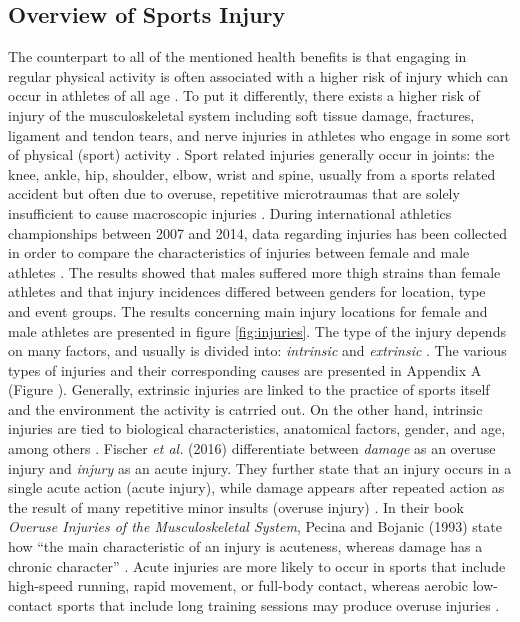 \subsection{Overview of Sports Injury}\label{subsection:injury}
The counterpart to all of the mentioned health benefits is that engaging in regular physical activity is often associated with a higher risk of injury which can occur in athletes of all age \cite{van1997severity}. To put it differently, there exists a higher risk of injury of the musculoskeletal system including soft tissue
damage, fractures, ligament and tendon tears, and nerve injuries in athletes who engage in some sort of physical (sport) activity \cite{mayr2015prevention}. Sport related injuries generally occur in joints: the knee, ankle, hip, shoulder, elbow, wrist and spine, usually from a sports related accident but often due to overuse, repetitive microtraumas that are solely insufficient to cause macroscopic injuries
 \cite{mayr2015prevention}. During international athletics championships between 2007 and 2014, data regarding injuries has been collected in order to compare the characteristics of injuries between female and male athletes \cite{edouard2015sex}. The results showed that males suffered more thigh strains than female athletes and that injury incidences differed between genders for location, type and event groups. The results concerning main injury locations for female and male athletes are presented in figure \ref{fig:injuries}. The type of the injury depends on many factors, and usually is divided into: \textit{intrinsic} and \textit{extrinsic} \cite{mayr2015prevention}. The various types of injuries and their corresponding causes are presented in Appendix A (Figure %
). Generally, extrinsic injuries are linked to the practice of sports itself and the environment the activity is catrried out. On the other hand, intrinsic injuries are tied to biological characteristics, anatomical factors, gender, and age, among others \cite{mayr2015prevention}. Fischer \textit{et al.} (2016) differentiate between \textit{damage} as an overuse injury and \textit{injury} as an acute injury. They further state that an injury occurs in a single acute action (acute injury), while damage appears after repeated action as the result of many repetitive minor insults (overuse injury) \cite{fischer2016causes}. In their book \textit{Overuse Injuries of the Musculoskeletal System}, Pecina and Bojanic (1993) state how ``the main characteristic of an injury is acuteness, whereas damage has a chronic character'' \cite{pecina1993overuse}. Acute injuries are more likely to occur in sports that include high-speed running, rapid movement, or full-body contact, whereas aerobic low-contact sports that include long training sessions may produce overuse injuries  \cite{mayr2015prevention}.
